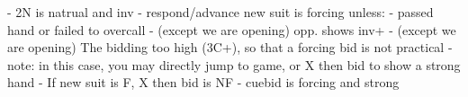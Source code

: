 - 2N is natrual and inv
- respond/advance new suit is forcing unless:
    - passed hand or failed to overcall
    - (except we are opening) opp. shows inv+
    - (except we are opening) The bidding too high (3C+), so that a forcing bid is not practical
        - note: in this case, you may directly jump to game, or X then bid to show a strong hand
- If new suit is F, X then bid is NF
- cuebid is forcing and strong
